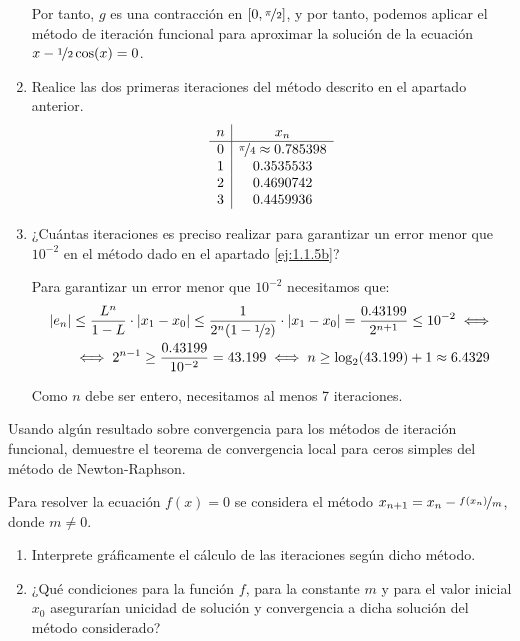 \begin{ejercicio}
\begin{enumerate}
        Por tanto, $g$ es una contracción en $[0,\nicefrac{\pi}{2}]$, y por tanto, podemos aplicar el método de iteración funcional para aproximar la solución de la ecuación $x-\nicefrac{1}{2}\cos(x)=0$.

        
        \item Realice las dos primeras iteraciones del método descrito en el apartado anterior.
        \begin{equation*}
            \begin{array}{c|c}
                n & x_n\\
                \hline
                0 & \nicefrac{\pi}{4}\approx 0.785398\\
                1 & 0.3535533\\
                2 & 0.4690742\\
                3 & 0.4459936
            \end{array}
        \end{equation*}
        \item ¿Cuántas iteraciones es preciso realizar para garantizar un error menor que $10^{-2}$ en el método dado en el apartado \ref{ej:1.1.5b}?
        
        Para garantizar un error menor que $10^{-2}$ necesitamos que:
        \begin{align*}
            |e_n|&\leq \dfrac{L^n}{1-L}\cdot |x_{1}-x_0|\leq \frac{1}{2^{n}(1-\nicefrac{1}{2})}\cdot |x_1-x_0|=\frac{0.43199}{2^{n+1}}
            \leq 10^{-2}\iff\\&\iff 2^{n-1}\geq \frac{0.43199}{10^{-2}}= 43.199
            \iff n\geq \log_2(43.199)+1\approx 6.4329
        \end{align*}

        Como $n$ debe ser entero, necesitamos al menos 7 iteraciones.

    \end{enumerate}
\end{ejercicio}

\begin{ejercicio}\label{ej:1.1.6}
    Usando algún resultado sobre convergencia para los métodos de iteración funcional, demuestre el teorema de convergencia local para ceros simples del método de Newton-Raphson.
\end{ejercicio}

\begin{ejercicio}\label{ej:1.1.7}
    Para resolver la ecuación $f(x) = 0$ se considera el método $x_{n+1} = x_n - \nicefrac{f(x_n)}{m}$, donde $m \neq 0$.
    \begin{enumerate}
        \item Interprete gráficamente el cálculo de las iteraciones según dicho método.
        \item ¿Qué condiciones para la función $f$, para la constante $m$ y para el valor inicial $x_0$ asegurarían unicidad de solución y convergencia a dicha solución del método considerado?
    \end{enumerate}
\end{ejercicio}

